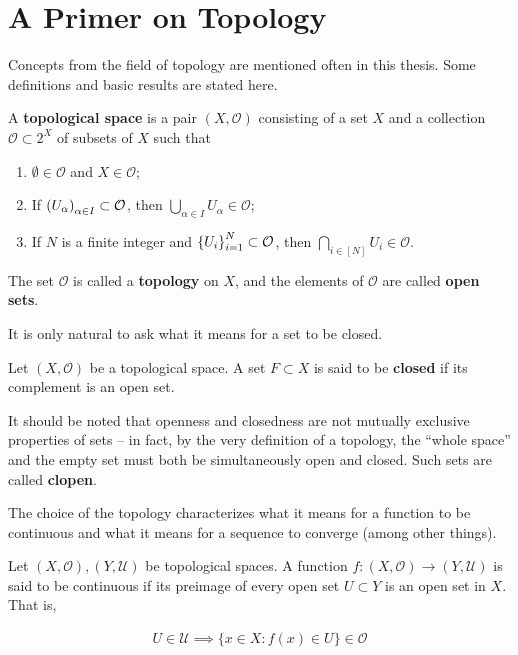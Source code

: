 \chapter{A Primer on Topology}\label{app:analysis}
Concepts from the field of topology are mentioned often in this
thesis. Some definitions and basic results are stated here.

\begin{definition}\label{def:topology}
  A \textbf{topological space} is a pair $(X, \mathcal{O})$ consisting of a set
  $X$ and a collection $\mathcal{O}\subset 2^X$ of subsets of $X$ such
  that
  \begin{enumerate}
  \item $\emptyset\in\mathcal{O}$ and $X\in\mathcal{O}$;
  \item If $\indexedin{I}{\alpha}{U}\subset\mathcal{O}$, then
    $\bigcup_{\alpha\in I}U_\alpha\in\mathcal{O}$;
  \item If $N$ is a finite integer and
    $\indexedint{i}{N}{U}\subset\mathcal{O}$,
    then $\bigcap_{i\in[N]}U_i\in\mathcal{O}$.
  \end{enumerate}

  The set $\mathcal{O}$ is called a \textbf{topology} on $X$, and the
  elements of $\mathcal{O}$ are called \textbf{open sets}.
\end{definition}

It is only natural to ask what it means for a set to be closed.

\begin{definition}
  Let $(X,\mathcal{O})$ be a topological space. A set $F\subset X$ is
  said to be \textbf{closed} if its complement is an open set.
\end{definition}

\begin{remark}
  It should be noted that openness and closedness are not mutually
  exclusive properties of sets -- in fact, by the very definition of a
  topology, the ``whole space'' and the empty set must both be
  simultaneously open and closed. Such sets are called \textbf{clopen}.
\end{remark}

The choice of the topology characterizes what it means for a function
to be continuous and what it means for a sequence to converge (among
other things).

\begin{definition}\label{def:continuity}
  Let $(X,\mathcal{O}), (Y,\mathcal{U})$ be topological spaces. A
  function $f:(X, \mathcal{O})\to(Y, \mathcal{U})$ is said to be
  continuous if its preimage of every open set $U\subset Y$ is an open
  set in $X$. That is,

  \begin{align*}
    U\in\mathcal{U}\implies\{x\in X: f(x)\in U\}\in\mathcal{O}
  \end{align*}
\end{definition}


